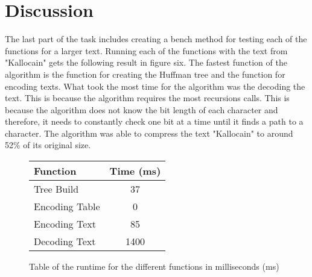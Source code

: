 \documentclass[a4paper,11pt]{article}
\begin{document}
\section*{Discussion}
The last part of the task includes creating a bench method for testing each of the functions for a larger text. Running each of the functions with the text from "Kallocain" gets the following result in figure six. The fastest function of the algorithm is the function for creating the Huffman tree and the function for encoding texts. What took the most time for the algorithm was the decoding the text. This is because the algorithm requires the most recursions calls. This is because the algorithm does not know the bit length of each character and therefore, it needs to constantly check one bit at a time until it finds a path to a character. The algorithm was able to compress the text "Kallocain" to around 52\% of its original size.

\begin{figure}[H]
\begin{center}
\begin{tabular}{l|c}
\textbf{Function} & \textbf{Time (ms)}\\
\hline
  Tree Build & 37\\
  Encoding Table & 0\\
  Encoding Text & 85\\
  Decoding Text & 1400\\
\end{tabular}
\caption{Table of the runtime for the different functions in milliseconds (ms)}
\label{Figure:6}
\end{center}
\end{figure}
\end{document}
